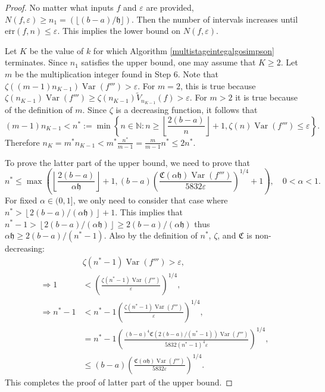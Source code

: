 \documentclass{iitthesis}
\DeclareMathOperator{\Var}{Var}
\theoremstyle{definition}
\theoremstyle{remark}
\begin{document}
\begin{proof}
  No matter what inputs $f$ and $\varepsilon$ are provided, $N(f,\varepsilon)\ge n_1=(\lfloor (b-a)/\mathfrak{h}\rfloor)$. Then the number of intervals increases until $\overline{\text{err}}(f,n)\le\varepsilon$. This implies the lower bound on $N(f,\varepsilon)$.

  Let $K$ be the value of $k$ for which Algorithm \ref{multistageintegalgosimpson} terminates. Since $n_1$ satisfies the upper bound, one may assume that $K \ge 2$. Let $m$ be the multiplication integer found in Step 6. Note that $\zeta((m-1)n_{K-1})\Var(f''')>\varepsilon$. For $m=2$, this is true because $\zeta(n_{K-1})\Var(f''')\ge\zeta(n_{K-1})\widetilde{V}_{n_{K-1}}(f)>\varepsilon$. For $m>2$ it is true because of the definition of $m$. Since $\zeta$ is a decreasing function, it follows that
  $$(m-1)n_{K-1}<n^*:=\min\left\{n\in\mathbb{N}:n\ge\left\lfloor\frac{2(b-a)}{n}\right\rfloor+1,\zeta(n)\Var(f''')\le\varepsilon\right\}.$$
  Therefore $n_K=m^*n_{K-1}<m^*\frac{n^*}{m-1}=\frac{m}{m-1}n^*\le2n^*$.

  To prove the latter part of the upper bound, we need to prove that
  $$n^*\leq\max\left(\left\lfloor\frac{2(b-a)}{\alpha\mathfrak{h}}\right\rfloor+1,(b-a)\left(\frac{\mathfrak{C}(\alpha\mathfrak{h})\Var(f''')}{5832\varepsilon}\right)^{1/4}+1\right),\quad 0<\alpha<1.$$
  For fixed $\alpha\in(0,1]$, we only need to consider that case where $n^*>\left\lfloor2(b-a)/(\alpha\mathfrak{h})\right\rfloor+1$. This implies that $n^*-1>\left\lfloor2(b-a)/(\alpha\mathfrak{h})\right\rfloor\ge 2(b-a)/(\alpha\mathfrak{h})$ thus $\alpha\mathfrak{h}\ge2(b-a)/(n^*-1)$. Also by the definition of $n^*$, $\zeta$, and $\mathfrak{C}$ is non-decreasing:
  \begin{align*}
    &\zeta(n^*-1)\Var(f''')>\varepsilon, \\
    \Rightarrow 1&<\left(\frac{\zeta(n^*-1)\Var(f''')}{\varepsilon}\right)^{1/4},\\
    \Rightarrow n^*-1&<n^*-1\left(\frac{\zeta(n^*-1)\Var(f''')}{\varepsilon}\right)^{1/4},\\
    &=n^*-1\left(\frac{(b-a)^4\mathfrak{C}(2(b-a)/(n^*-1))\Var(f''')}{5832(n^*-1)^4\varepsilon}\right)^{1/4},\\
    &\le(b-a)\left(\frac{\mathfrak{C}(\alpha\mathfrak{h})\Var(f''')}{5832\varepsilon}\right)^{1/4}.
  \end{align*}
  This completes the proof of latter part of the upper bound.
\end{proof}
\end{document}
